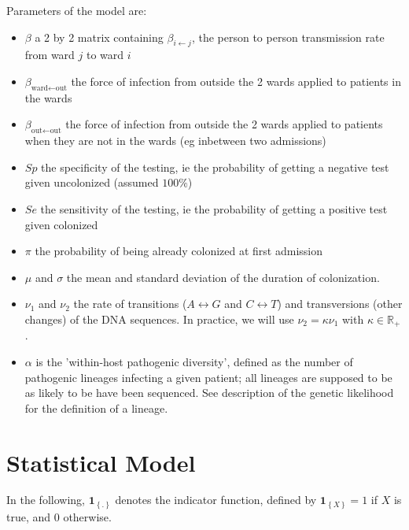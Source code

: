 \documentclass[10pt]{article}
\begin{document}
Parameters of the model are: 
\begin{itemize}
	\item $\beta$ a 2 by 2 matrix containing $\beta_{i \leftarrow j}$, the person to person transmission rate from ward $j$ to ward $i$
	\item $\beta_{\text{ward} \leftarrow \text{out}}$ the force of infection from outside the 2 wards applied to patients in the wards
	\item $\beta_{\text{out} \leftarrow \text{out}}$ the force of infection from outside the 2 wards applied to patients when they are not in the wards (eg inbetween two admissions)
	\item $Sp$ the specificity of the testing, ie the probability of getting a negative test given uncolonized (assumed $100\%$)
	\item $Se$ the sensitivity of the testing, ie the probability of getting a positive test given colonized
	\item $\pi$ the probability of being already colonized at first admission
	\item $\mu$ and $\sigma$ the mean and standard deviation of the duration of colonization.
	\item $\nu_1$ and $\nu_2$ the rate of transitions ($A \leftrightarrow G$ and $C \leftrightarrow T$) and transversions (other changes) of the DNA sequences. In practice, we will use $\nu_2=\kappa\nu_1$ with $\kappa \in \mathbb{R}_+$.
	\item $\alpha$ is the 'within-host pathogenic diversity', defined as the number of pathogenic lineages infecting a given patient; all lineages are supposed to be as likely to be have been sequenced. See description of the genetic likelihood for the definition of a lineage.
\end{itemize}

\section*{Statistical Model}

In the following, $\mathbf{1}_{\left\lbrace.\right\rbrace}$ denotes the indicator function, defined by $\mathbf{1}_{\left\lbrace X \right\rbrace}=1$ if $X$ is true, and $0$ otherwise.
\end{document}
